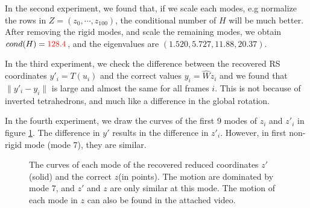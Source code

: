 \documentclass[9pt,twocolumn]{extarticle}
\newcommand{\TODO}[1]{\textcolor{red}{#1}}
\begin{document}
In the second experiment, we found that, if we scale each modes, e.g normalize
the rows in $Z=(z_0,\cdots,z_{100})$, the conditional number of $H$ will be much
better. After removing the rigid modes, and scale the remaining modes, we obtain
$cond(H)=\TODO{128.4}$, and the eigenvalues are $(1.520,5.727,11.88,20.37)$.

In the third experiment, we check the difference between the recovered RS
coordinates $y'_i=T(u_i)$ and the correct values $y_i=\hat{W}z_i$ and we found
that $\|y'_i-y_i\|$ is large and almost the same for all frames $i$. This is not
because of inverted tetrahedrons, and much like a difference in the global
rotation.

In the fourth experiment, we draw the curves of the first 9 modes of $z_i$ and
$z'_i$ in figure \ref{dft}. The difference in $y'$ results in the difference in
$z'_i$. However, in first non-rigid mode (mode 7), they are similar.

\begin{figure}
  \centering
  \caption{The curves of each mode of the recovered reduced coordinates
    $z'$(solid) and the correct $z$(in points). The motion are dominated by mode
    7, and $z'$ and $z$ are only similar at this mode. The motion of each mode
    in $z$ can also be found in the attached video.}
  \label{dft}
\end{figure}
\end{document}
